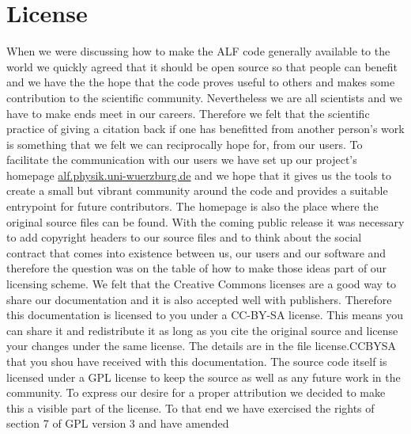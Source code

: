 
\section*{License}
When we were discussing how to make the ALF code generally available to the world we quickly
agreed that it should be open source so that people can benefit and we have the the hope that the code 
proves useful to others and makes some contribution to the scientific community.
Nevertheless we are all scientists and we have to make ends meet in our careers. Therefore we felt that the scientific practice 
of giving a citation back if one has benefitted from another person's work is something that we felt we can reciprocally hope for, from our users.
To facilitate the communication with our users we have set up our project's homepage \url{alf.physik.uni-wuerzburg.de}
and we hope that it gives us the tools to create a small but vibrant community around the code and provides a suitable
entrypoint for future contributors.
The homepage is also the place where the original source files can be found.
With the coming public release it was necessary to add copyright headers to our source files and to think about the 
social contract that comes into existence between us, our users and our software and therefore the question was on 
the table of how to make those ideas part of our licensing scheme.
We felt that the Creative Commons licenses are a good way to share our documentation and it is also
accepted well with publishers. Therefore this documentation is licensed to you under a CC-BY-SA license.
This means you can share it and redistribute it as long as you cite the original source and
license your changes under the same license. The details are in the file license.CCBYSA that you shou have received with this documentation.
The source code itself is licensed under a GPL license to keep the source as well as any future work in the community.
To express our desire for a proper attribution we decided to make this a visible part of the license.
To that end we have exercised the rights of section 7 of GPL version 3 and have amended
